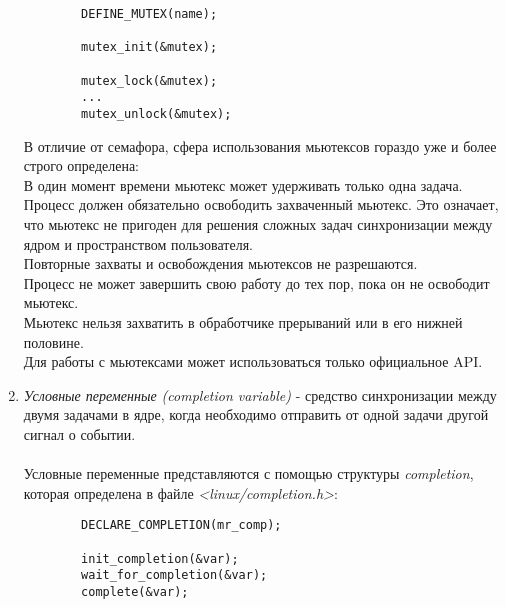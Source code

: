 \begin{enumerate}
    \begin{lstlisting}
        DEFINE_MUTEX(name);
    
        mutex_init(&mutex);
        
        mutex_lock(&mutex);
        ...
        mutex_unlock(&mutex);
    \end{lstlisting}
    В отличие от семафора, сфера использования мьютексов гораздо уже и более строго определена:
    \\
    В один момент времени мьютекс может удерживать только одна задача.
    \\
    Процесс должен обязательно освободить захваченный мьютекс. Это означает, что мьютекс не пригоден для решения сложных задач синхронизации между ядром и пространством пользователя.
    \\
    Повторные захваты и освобождения мьютексов не разрешаются.
    \\
    Процесс не может завершить свою работу до тех пор, пока он не освободит мьютекс.
    \\
    Мьютекс нельзя захватить в обработчике прерываний или в его нижней половине.
    \\
    Для работы с мьютексами может использоваться только официальное API.
    \item \textit{Условные переменные (completion variable)} - средство синхронизации между двумя задачами в ядре, когда необходимо отправить от одной задачи другой сигнал о событии.
    \\\\
    Условные переменные представляются с помощью структуры  \textit{completion}, которая определена в файле  \textit{<linux/completion.h>}:

    \begin{lstlisting}
        DECLARE_COMPLETION(mr_comp);
        
        init_completion(&var);
        wait_for_completion(&var);
        complete(&var);
    \end{lstlisting}
\end{enumerate}

